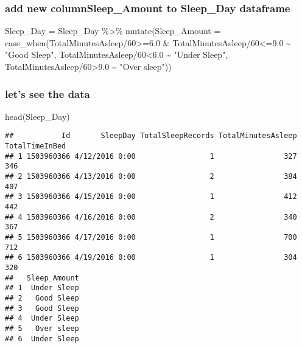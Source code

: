 \documentclass[
]{article}
\newenvironment{Shaded}{\begin{snugshade}}{\end{snugshade}}
\newcommand{\AttributeTok}[1]{\textcolor[rgb]{0.77,0.63,0.00}{#1}}
\newcommand{\DecValTok}[1]{\textcolor[rgb]{0.00,0.00,0.81}{#1}}
\newcommand{\FloatTok}[1]{\textcolor[rgb]{0.00,0.00,0.81}{#1}}
\newcommand{\FunctionTok}[1]{\textcolor[rgb]{0.00,0.00,0.00}{#1}}
\newcommand{\NormalTok}[1]{#1}
\newcommand{\OtherTok}[1]{\textcolor[rgb]{0.56,0.35,0.01}{#1}}
\newcommand{\SpecialCharTok}[1]{\textcolor[rgb]{0.00,0.00,0.00}{#1}}
\newcommand{\StringTok}[1]{\textcolor[rgb]{0.31,0.60,0.02}{#1}}
\begin{document}
\hypertarget{add-new-columnsleep_amount-to-sleep_day-dataframe}{%
\subsubsection{add new columnSleep\_Amount to Sleep\_Day
dataframe}\label{add-new-columnsleep_amount-to-sleep_day-dataframe}}

\begin{Shaded}
\begin{Highlighting}[]
\NormalTok{Sleep\_Day }\OtherTok{=}\NormalTok{ Sleep\_Day }\SpecialCharTok{\%\textgreater{}\%} 
\FunctionTok{mutate}\NormalTok{(}\AttributeTok{Sleep\_Amount =} \FunctionTok{case\_when}\NormalTok{(TotalMinutesAsleep}\SpecialCharTok{/}\DecValTok{60}\SpecialCharTok{\textgreater{}=}\FloatTok{6.0} \SpecialCharTok{\&}\NormalTok{ TotalMinutesAsleep}\SpecialCharTok{/}\DecValTok{60}\SpecialCharTok{\textless{}=}\FloatTok{9.0}   \SpecialCharTok{\textasciitilde{}} \StringTok{"Good Sleep"}\NormalTok{,}
\NormalTok{    TotalMinutesAsleep}\SpecialCharTok{/}\DecValTok{60}\SpecialCharTok{\textless{}}\FloatTok{6.0} \SpecialCharTok{\textasciitilde{}} \StringTok{"Under Sleep"}\NormalTok{, }
\NormalTok{    TotalMinutesAsleep}\SpecialCharTok{/}\DecValTok{60}\SpecialCharTok{\textgreater{}}\FloatTok{9.0} \SpecialCharTok{\textasciitilde{}} \StringTok{"Over sleep"}\NormalTok{))}
\end{Highlighting}
\end{Shaded}

\hypertarget{lets-see-the-data}{%
\subsubsection{let's see the data}\label{lets-see-the-data}}

\begin{Shaded}
\begin{Highlighting}[]
\FunctionTok{head}\NormalTok{(Sleep\_Day)}
\end{Highlighting}
\end{Shaded}

\begin{verbatim}
##           Id       SleepDay TotalSleepRecords TotalMinutesAsleep TotalTimeInBed
## 1 1503960366 4/12/2016 0:00                 1                327            346
## 2 1503960366 4/13/2016 0:00                 2                384            407
## 3 1503960366 4/15/2016 0:00                 1                412            442
## 4 1503960366 4/16/2016 0:00                 2                340            367
## 5 1503960366 4/17/2016 0:00                 1                700            712
## 6 1503960366 4/19/2016 0:00                 1                304            320
##   Sleep_Amount
## 1  Under Sleep
## 2   Good Sleep
## 3   Good Sleep
## 4  Under Sleep
## 5   Over sleep
## 6  Under Sleep
\end{verbatim}
\end{document}
